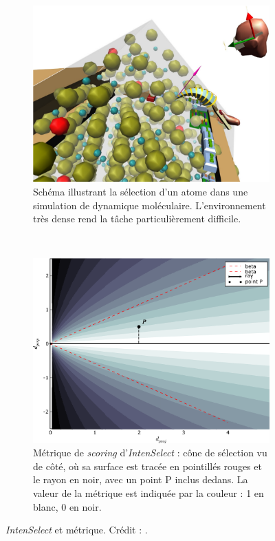 	\begin{figure}[!htb]
		\begin{subfigure}[t]{0.49\textwidth}
			\centering
			\includegraphics[width=\textwidth]{figures/ch2/intensMD}
			\caption{Schéma illustrant la sélection d'un atome dans une simulation de dynamique moléculaire. L'environnement très dense rend la tâche particulièrement difficile.}
			\label{fig:intensMD}
		\end{subfigure}
		~
		\begin{subfigure}[t]{0.49\textwidth}
			\centering
			\includegraphics[width=\textwidth]{figures/ch2/intensMetric}
			\caption{Métrique de \emph{scoring} d'\emph{IntenSelect} : cône de sélection vu de côté, où sa surface est tracée en pointillés rouges et le rayon en noir, avec un point P inclus dedans. La valeur de la métrique est indiquée par la couleur : 1 en blanc, 0 en noir.}
			\label{fig:intensMetric}
		\end{subfigure}
		\caption[\emph{IntenSelect} et métrique]{\emph{IntenSelect} et métrique. Crédit : \cite{de2005intenselect}.}
		\label{fig:plop}
	\end{figure}
	
